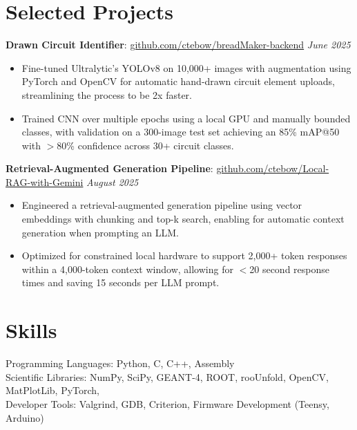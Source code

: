 \documentclass[10pt]{article}
\begin{document}
\section*{Selected Projects}

\textbf{Drawn Circuit Identifier}:
\href{https://github.com/ctebow/breadMaker-backend}{github.com/ctebow/breadMaker-backend} \hfill \emph{June 2025}
\begin{itemize}
\item Fine-tuned Ultralytic's YOLOv8 on 10,000+ images with augmentation using PyTorch and OpenCV for automatic hand-drawn circuit element uploads, streamlining the process to be 2x faster.
\item Trained CNN over multiple epochs using a local GPU and manually bounded classes, with validation on a 300-image test set achieving an 85\% mAP@50 with $>$80\% confidence across 30+ circuit classes.
\end{itemize}

\textbf{Retrieval-Augmented Generation Pipeline}:
\href{https://github.com/ctebow/Local-RAG-with-Gemini}{github.com/ctebow/Local-RAG-with-Gemini} \hfill \emph{August 2025}
\begin{itemize}
\item Engineered a retrieval-augmented generation pipeline using vector embeddings with chunking and top-k search, enabling for automatic context generation when prompting an LLM.
\item Optimized for constrained local hardware to support 2,000+ token responses within a 4,000-token context window, allowing for $<$20 second response times and saving 15 seconds per LLM prompt.
\end{itemize}

\section*{Skills}

Programming Languages: Python, C, C++, Assembly \\
Scientific Libraries: NumPy, SciPy, GEANT-4, ROOT, rooUnfold, OpenCV, MatPlotLib, PyTorch, \\
Developer Tools: Valgrind, GDB, Criterion, Firmware Development (Teensy, Arduino)

\end{document}
